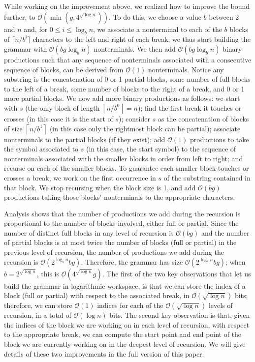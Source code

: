 \documentclass[runningheads]{llncs}
\newcommand{\Oh}[1]
    {\ensuremath{\mathcal{O}\!\left( {#1} \right)}}
\begin{document}
While working on the improvement above, we realized how to improve the bound further, to $\Oh{\min \left( g, 4^{\sqrt{\log n}} \right)}$.  To do this, we choose a value $b$ between 2 and $n$ and, for \(0 \leq i \leq \log_b n\), we associate a nonterminal to each of the $b$ blocks of \(\lceil n / b^i \rceil\) characters to the left and right of each break; we thus start building the grammar with $\Oh{b g \log_b n}$ nonterminals.  We then add $\Oh{b g \log_b n}$ binary productions such that any sequence of nonterminals associated with a consecutive sequence of blocks, can be derived from $\Oh{1}$ nonterminals.  Notice any substring is the concatenation of 0 or 1 partial blocks, some number of full blocks to the left of a break, some number of blocks to the right of a break, and 0 or 1 more partial blocks.  We now add more binary productions as follows: we start with $s$ (the only block of length \(\left\lceil n / b^0 \right\rceil = n\)); find the first break it touches or crosses (in this case it is the start of $s$); consider $s$ as the concatenation of blocks of size \(\left\lceil n / b^1 \right\rceil\) (in this case only the rightmost block can be partial); associate nonterminals to the partial blocks (if they exist); add $\Oh{1}$ productions to take the symbol associated to $s$ (in this case, the start symbol) to the sequence of nonterminals associated with the smaller blocks in order from left to right; and recurse on each of the smaller blocks.  To guarantee each smaller block touches or crosses a break, we work on the first occurrence in $s$ of the substring contained in that block.  We stop recursing when the block size is 1, and add $\Oh{b g}$ productions taking those blocks' nonterminals to the appropriate characters.

Analysis shows that the number of productions we add during the recursion is proportional to the number of blocks involved, either full or partial.  Since the number of distinct full blocks in any level of recursion is $\Oh{b g}$ and the number of partial blocks is at most twice the number of blocks (full or partial) in the previous level of recursion, the number of productions we add during the recursion is $\Oh{2^{\log_b n} b g}$.  Therefore, the grammar has size $\Oh{2^{\log_b n} b g}$; when \(b = 2^{\sqrt{\log n}}\), this is $\Oh{4^{\sqrt{\log n}} g}$.  The first of the two key observations that let us build the grammar in logarithmic workspace, is that we can store the index of a block (full or partial) with respect to the associated break, in $\Oh{\sqrt{\log n}}$ bits; therefore, we can store $\Oh{1}$ indices for each of the $\Oh{\sqrt{\log n}}$ levels of recursion, in a total of $\Oh{\log n}$ bits.  The second key observation is that, given the indices of the block we are working on in each level of recursion, with respect to the appropriate break, we can compute the start point and end point of the block we are currently working on in the deepest level of recursion.  We will give details of these two improvements in the full version of this paper.
\end{document}
